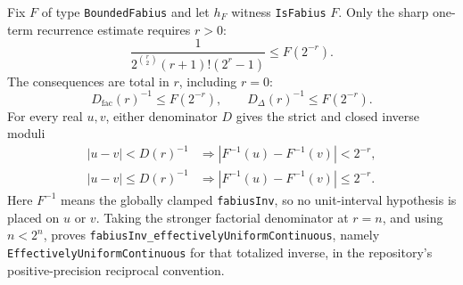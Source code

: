 \documentclass[11pt,oneside]{article}
\theoremstyle{definition}
\theoremstyle{remark}
\begin{document}
Fix \(F\) of type \nolinkurl{BoundedFabius} and let \(h_F\) witness
\nolinkurl{IsFabius} \(F\).  Only the sharp one-term recurrence estimate
requires \(r>0\):
\[
 \frac{1}{
   2^{\binom r2}(r+1)!(2^r-1)}
 \le F(2^{-r}).
\]
The consequences are total in \(r\), including \(r=0\):
\[
 D_{\mathrm{fac}}(r)^{-1}\le F(2^{-r}),
 \qquad
 D_{\Delta}(r)^{-1}\le F(2^{-r}).
\]
For every real \(u,v\), either denominator \(D\) gives the strict and closed
inverse moduli
\[
\begin{aligned}
 |u-v|<D(r)^{-1}
   &\Longrightarrow |F^{-1}(u)-F^{-1}(v)|<2^{-r},\\
 |u-v|\le D(r)^{-1}
   &\Longrightarrow |F^{-1}(u)-F^{-1}(v)|\le2^{-r}.
\end{aligned}
\]
Here \(F^{-1}\) means the globally clamped \nolinkurl{fabiusInv}, so no
unit-interval hypothesis is placed on \(u\) or \(v\).  Taking the stronger
factorial denominator at \(r=n\), and using \(n<2^n\), proves
\nolinkurl{fabiusInv_effectivelyUniformContinuous}, namely
\nolinkurl{EffectivelyUniformContinuous} for that totalized inverse, in the
repository's positive-precision reciprocal convention.
\end{document}
